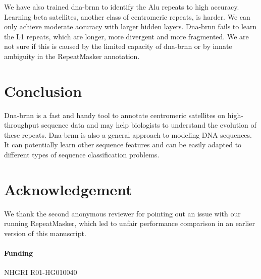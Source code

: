 \documentclass{bioinfo}
\begin{document}
We have also trained dna-brnn to identify the Alu repeats to high accuracy.
Learning beta satellites, another class of centromeric repeats, is harder. We
can only achieve moderate accuracy with larger hidden layers. Dna-brnn
fails to learn the L1 repeats, which are longer, more divergent and
more fragmented. We are not sure if this is caused by the limited capacity of
dna-brnn or by innate ambiguity in the RepeatMasker annotation.

\section{Conclusion}

Dna-brnn is a fast and handy tool to annotate centromeric satellites on
high-throughput sequence data and may help biologists to understand the
evolution of these repeats. Dna-brnn is also a general approach to modeling DNA
sequences. It can potentially learn other sequence features and can be easily
adapted to different types of sequence classification problems.

\section*{Acknowledgement}

We thank the second anonymous reviewer for pointing out an issue with our
running RepeatMasker, which led to unfair performance comparison in an earlier
version of this manuscript.

\paragraph{Funding\textcolon} NHGRI R01-HG010040


\end{document}
